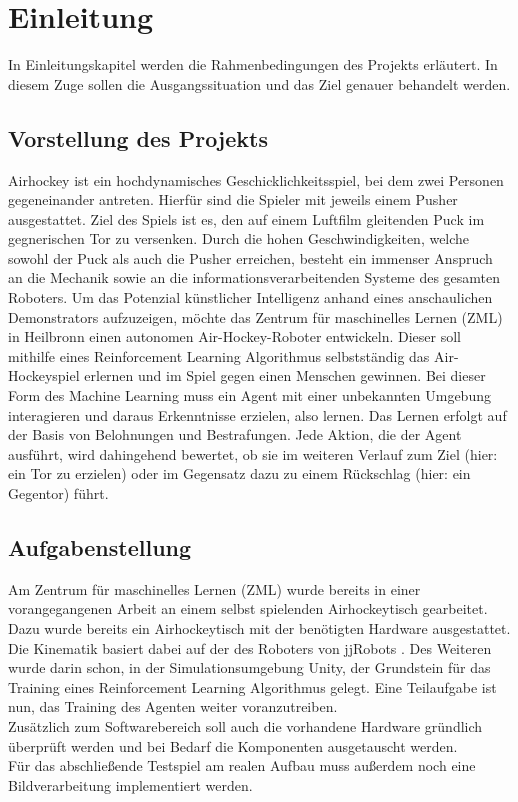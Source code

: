 \chapter{Einleitung}
\label{ch:Einleitung}


In Einleitungskapitel werden die Rahmenbedingungen des Projekts erläutert.
In diesem Zuge sollen die Ausgangssituation und das Ziel genauer behandelt werden.

\section{Vorstellung des Projekts}
\label{sect:Projektvorstellung}
Airhockey ist ein hochdynamisches Geschicklichkeitsspiel, bei dem zwei Personen gegeneinander antreten. Hierfür sind die Spieler mit jeweils einem Pusher ausgestattet. Ziel des Spiels ist es, den auf einem Luftfilm gleitenden Puck im gegnerischen Tor zu versenken. Durch die hohen Geschwindigkeiten, welche sowohl der Puck als auch die Pusher erreichen, besteht ein immenser Anspruch an die Mechanik sowie an die informationsverarbeitenden
Systeme des gesamten Roboters.
Um das Potenzial künstlicher Intelligenz anhand eines anschaulichen Demonstrators aufzuzeigen, möchte das Zentrum für maschinelles Lernen (ZML) in Heilbronn einen autonomen Air-Hockey-Roboter entwickeln. Dieser soll mithilfe eines Reinforcement Learning Algorithmus selbstständig das Air-Hockeyspiel erlernen und im Spiel gegen einen Menschen gewinnen.
Bei dieser Form des Machine Learning muss ein Agent mit einer unbekannten Umgebung interagieren und daraus Erkenntnisse erzielen, also lernen. Das Lernen erfolgt auf der Basis von Belohnungen und Bestrafungen. Jede Aktion, die der Agent ausführt, wird dahingehend bewertet, ob sie im weiteren Verlauf zum Ziel (hier: ein Tor zu erzielen) oder im Gegensatz dazu zu einem Rückschlag (hier: ein Gegentor) führt.

\section{Aufgabenstellung}
\label{sect:Aufgabenstellung}
Am Zentrum für maschinelles Lernen (ZML) wurde bereits in einer vorangegangenen Arbeit an einem selbst spielenden Airhockeytisch gearbeitet. Dazu wurde bereits ein Airhockeytisch mit der benötigten Hardware ausgestattet. Die Kinematik basiert dabei auf der des Roboters von jjRobots \cite{jjrob}. Des Weiteren wurde darin schon, in der Simulationsumgebung Unity, der Grundstein für das Training eines Reinforcement Learning Algorithmus gelegt. Eine Teilaufgabe ist nun, das Training des Agenten weiter voranzutreiben.\\ Zusätzlich zum Softwarebereich soll auch die vorhandene Hardware gründlich überprüft werden und bei Bedarf die Komponenten ausgetauscht werden.\\
Für das abschließende Testspiel am realen Aufbau muss außerdem noch eine Bildverarbeitung implementiert werden.

